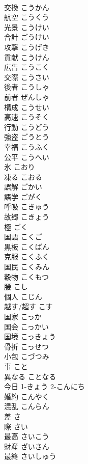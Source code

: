 \documentclass[8pt]{extreport}
\begin{document}
\begin{CJK}{UTF8}{min}
\\	交換	こうかん	
\\	航空	こうくう	
\\	光景	こうけい	
\\	合計	ごうけい	
\\	攻撃	こうげき	
\\	貢献	こうけん	
\\	広告	こうこく	
\\	交際	こうさい	
\\	後者	こうしゃ	
\\	前者	ぜんしゃ	
\\	構成	こうせい	
\\	高速	こうそく	
\\	行動	こうどう	
\\	強盗	ごうとう	
\\	幸福	こうふく	
\\	公平	こうへい	
\\	氷	こおり	
\\	凍る	こおる	
\\	誤解	ごかい	
\\	語学	ごがく	
\\	呼吸	こきゅう	
\\	故郷	こきょう	
\\	極	ごく	
\\	国語	こくご	
\\	黒板	こくばん	
\\	克服	こくふく	
\\	国民	こくみん	
\\	穀物	こくもつ	
\\	腰	こし	
\\	個人	こじん	
\\	越す/超す	こす	
\\	国家	こっか	
\\	国会	こっかい	
\\	国境	こっきょう	
\\	骨折	こっせつ	
\\	小包	こづつみ	
\\	事	こと	
\\	異なる	ことなる	
\\	今日	1-きょう 2-こんにち	
\\	婚約	こんやく	
\\	混乱	こんらん	
\\	差	さ	
\\	際	さい	
\\	最高	さいこう	
\\	財産	ざいさん	
\\	最終	さいしゅう	

\end{CJK}
\end{document}
